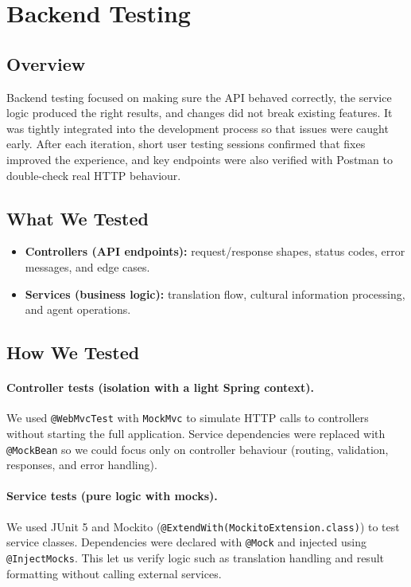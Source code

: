 \cleardoublepage
\section{Backend Testing}
\label{sec:be-testing}

\subsection{Overview}
Backend testing focused on making sure the API behaved correctly, the service logic produced the right results, and changes did not break existing features. 
It was tightly integrated into the development process so that issues were caught early. 
After each iteration, short user testing sessions confirmed that fixes improved the experience, and key endpoints were also verified with Postman to double-check real HTTP behaviour.


\subsection{What We Tested}
\begin{itemize}
    \item \textbf{Controllers (API endpoints):} request/response shapes, status codes, error messages, and edge cases.
    \item \textbf{Services (business logic):} translation flow, cultural information processing, and agent operations.
\end{itemize}

\subsection{How We Tested}
\paragraph{Controller tests (isolation with a light Spring context).}
We used \texttt{@WebMvcTest} with \texttt{MockMvc} to simulate HTTP calls to controllers without starting the full application. Service dependencies were replaced with \texttt{@MockBean} so we could focus only on controller behaviour (routing, validation, responses, and error handling).

\paragraph{Service tests (pure logic with mocks).}
We used JUnit 5 and Mockito (\texttt{@ExtendWith(MockitoExtension.class)}) to test service classes. Dependencies were declared with \texttt{@Mock} and injected using \texttt{@InjectMocks}. This let us verify logic such as translation handling and result formatting without calling external services.

